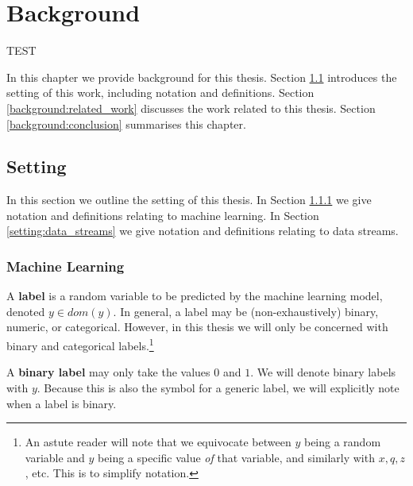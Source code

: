 \chapter{Background} \label{chapt:Background}

TEST

In this chapter we provide background for this thesis. Section \ref{background:setting} introduces the setting of this work, including notation and definitions. Section \ref{background:related_work} discusses the work related to this thesis. Section \ref{background:conclusion} summarises this chapter.


\section{Setting} \label{background:setting}

In this section we outline the setting of this thesis. In Section \ref{setting:ml} we give notation and definitions relating to machine learning.  In Section \ref{setting:data_streams} we give notation and definitions relating to data streams.  

\subsection{Machine Learning} \label{setting:ml}

\newcommand{\y}[1]{y^{(#1)}}
\newcommand{\yhat}[1]{\hat{y}^{(#1)}}
\newcommand{\q}[1]{q^{(#1)}}
\newcommand{\qhat}[1]{\hat{q}^{(#1)}}
\newcommand{\id}[1]{\mathds{1}[#1]} %
\newcommand{\x}[1]{x^{(#1)}}
\newcommand{\X}[1]{X^{(#1)}}

A {\bf label} is a random variable to be predicted by the machine learning model, denoted $y\in dom(y)$. In general, a label may be (non-exhaustively) binary, numeric, or categorical. However, in this thesis we will only be concerned with binary and categorical labels.\footnote{An astute reader will note that we equivocate between $y$ being a random variable and $y$ being a specific value {\it of} that variable, and similarly with $x,q,z$, etc. This is to simplify notation.}  

A {\bf binary label} may only take the values $0$ and $1$. We will denote binary labels with $y$. Because this is also the symbol for a generic label, we will explicitly note when a label is binary. 

